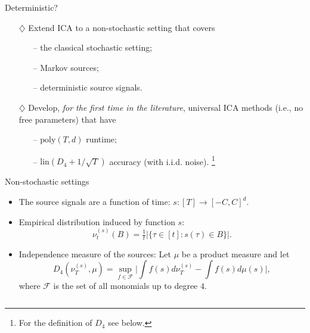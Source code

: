 \documentclass[final]{beamer} %
\begin{document}
\begin{frame}[c]
\begin{columns}[t,totalwidth=\textwidth]
\begin{column}{.24\textwidth}
\begin{block}{Deterministic?}
			\vspace{1cm}
			\begin{tcolorbox}[title = \vspace{0.4cm}\textbf{\large Our Contributions} \vspace{0.4cm}, title filled, width = 0.9\textwidth, colback = uofagreen!10, colframe = red]
			\begin{itemize}
			\vspace{0.5cm}
			\item[$\diamondsuit$] Extend ICA to a non-stochastic setting that covers
			\begin{itemize}
			\item[--] the classical stochastic setting;
			\item[--] Markov sources;
			\item[--] deterministic source signals.
			\end{itemize} 
			\vspace{1cm}
			\item[$\diamondsuit$] Develop, \emph{for the first time in the literature}, 
			\alert{universal} ICA methods (i.e., no free parameters) that 
			have
				\begin{itemize}
					\item[--] $\mathrm{poly}(T,d)$ runtime;
					\item[--] $\mathrm{lin}(D_4+1/\sqrt{T})$ accuracy (with i.i.d. noise).%
					\footnote{For the definition of $D_4$ see below.}
				\end{itemize}
			\end{itemize}		
			\end{tcolorbox}
		\end{block}
		\vspace{0.5ex}
		\begin{block}{Non-stochastic settings}
			\begin{itemize}
				\item The source signals are a function of time: $s:[T] \to [-C,C]^d$.
				\item Empirical distribution induced by function $s$:
				\[
					\nu_t^{(s)}(B)=\tfrac{1}{t}|\{\tau \in [t]: s(\tau) \in B\}|.
				\]
				\item Independence measure of the sources:
				Let $\mu$ be a product measure and let
				\[
				D_4(\nu_T^{(s)},\mu) = \sup_{f\in\mathcal{F}} \Big|\int f(s)d\nu_T^{(s)} - \int f(s)d\mu(s)\Big|,
				\]
				where $\mathcal{F}$ is the set of all monomials up to degree $4$.
			\end{itemize}
		\end{block}

\end{column}
\end{columns}
\end{frame}
\end{document}
